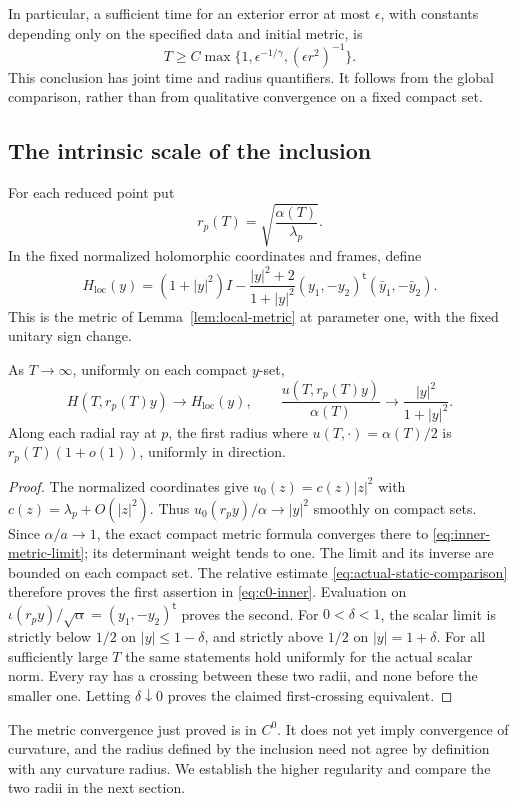 In particular, a sufficient time for an exterior error at most
\(\epsilon\), with constants depending only on the specified
data and initial metric, is
\[
 T\ge C\max\{1,\epsilon^{-1/\gamma},(\epsilon r^2)^{-1}\}.
\]
This conclusion has joint time and radius quantifiers. It
follows from the global comparison, rather than from qualitative
convergence on a fixed compact set.

\subsection{The intrinsic scale of the inclusion}

For each reduced point put
\begin{equation}\label{eq:intrinsic-radius}
 r_p(T)=\sqrt{\frac{\alpha(T)}{\lambda_p}}.
\end{equation}
In the fixed normalized holomorphic coordinates and frames,
define
\begin{equation}\label{eq:inner-metric-limit}
 H_{\mathrm{loc}}(y)
 =(1+|y|^2)I-\frac{|y|^2+2}{1+|y|^2}
      (y_1,-y_2)^{\mathsf t}(\bar y_1,-\bar y_2).
\end{equation}
This is the metric of Lemma~\ref{lem:local-metric} at
parameter one, with the fixed unitary sign change.

\begin{corollary}\label{cor:c0-inner}
As \(T\to\infty\), uniformly on each compact \(y\)-set,
\begin{equation}\label{eq:c0-inner}
 H(T,r_p(T)y)\longrightarrow H_{\mathrm{loc}}(y),\qquad
 \frac{u(T,r_p(T)y)}{\alpha(T)}
       \longrightarrow\frac{|y|^2}{1+|y|^2}.
\end{equation}
Along each radial ray at \(p\), the first radius where
\(u(T,\cdot)=\alpha(T)/2\) is
\(r_p(T)(1+o(1))\), uniformly in direction.
\end{corollary}

\begin{proof}
The normalized coordinates give \(u_0(z)=c(z)|z|^2\)
with \(c(z)=\lambda_p+O(|z|^2)\). Thus
\(u_0(r_py)/\alpha\to|y|^2\) smoothly on compact
sets. Since \(\alpha/a\to1\), the exact compact
metric formula converges there to
\eqref{eq:inner-metric-limit}; its determinant weight
tends to one. The limit and its inverse are bounded
on each compact set. The relative estimate
\eqref{eq:actual-static-comparison} therefore proves
the first assertion in \eqref{eq:c0-inner}.
Evaluation on
\(\iota(r_py)/\sqrt\alpha=(y_1,-y_2)^{\mathsf t}\)
proves the second.
For \(0<\delta<1\), the scalar limit is strictly
below \(1/2\) on \(|y|\le1-\delta\), and strictly
above \(1/2\) on \(|y|=1+\delta\).
For all sufficiently large \(T\) the same statements
hold uniformly for the actual scalar norm. Every ray
has a crossing between these two radii, and none
before the smaller one. Letting \(\delta\downarrow0\)
proves the claimed first-crossing equivalent.
\end{proof}

The metric convergence just proved is in \(C^0\). It does not
yet imply convergence of curvature, and the radius defined by
the inclusion need not agree by definition with any curvature
radius. We establish the higher regularity and compare the two
radii in the next section.
